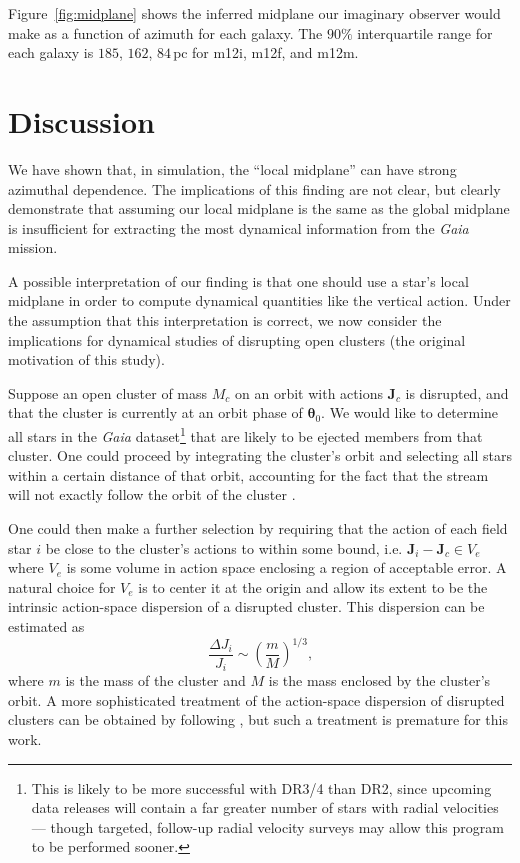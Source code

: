 \documentclass[twocolumn]{aastex62}
\newcommand{\pc}{\text{pc}}
\newcommand{\beq}{\begin{equation}}
\newcommand{\eeq}{\end{equation}}
\begin{document}
Figure~\ref{fig:midplane} shows the inferred midplane our imaginary observer
would make as a function of azimuth for each galaxy. The $90\%$ interquartile
range for each galaxy is $185$, $162$, $84\,\pc$ for m12i, m12f, and m12m. 

\begin{figure*}
\caption{Caption.}
\label{fig:midplane}
\end{figure*}

\section{Discussion} \label{sec:discussion}
We have shown that, in simulation, the ``local midplane'' can have strong
azimuthal dependence. The implications of this finding are not clear, but
clearly demonstrate that assuming our local midplane is the same as the global
midplane is insufficient for extracting the most dynamical information from
the {\em Gaia} mission.

A possible interpretation of our finding is that one should use a star's local
midplane in order to compute dynamical quantities like the vertical action.
Under the assumption that this interpretation is correct, we now consider the
implications for dynamical studies of disrupting open clusters (the original
motivation of this study).

Suppose an open cluster of mass $M_c$ on an orbit with actions $\bm{J}_c$ is
disrupted, and that the cluster is currently at an orbit phase of
$\bm{\theta}_0$. We would like to determine all stars in the {\em Gaia}
dataset\footnote{This is likely to be more successful with DR3/4 than DR2,
since upcoming data releases will contain a far greater number of stars with
radial velocities --- though targeted, follow-up radial velocity surveys may
allow this program to be performed sooner.} that are likely to be ejected
members from that cluster. One could proceed by integrating the cluster's
orbit and selecting all stars within a certain distance of that orbit,
accounting for the fact that the stream will not exactly follow the orbit of
the cluster \citep[e.g.][]{2011MNRAS.413.1852E}.

One could then make a further selection by requiring that the action of each
field star $i$ be close to the cluster's actions to within some bound, i.e.
$\bm{J}_i - \bm{J}_c \in V_e$ where $V_e$ is some volume in action space
enclosing a region of acceptable error. A natural choice for $V_e$ is to
center it at the origin and allow its extent to be the intrinsic action-space
dispersion of a disrupted cluster. This dispersion can be estimated as
\citep[\S~8.3.3][]{2008gady.book.....B}
\beq \label{eq:action_disp}
\frac{\Delta J_i}{J_i} \sim \left(\frac{m}{M}\right)^{1/3}\text{,}
\eeq
where $m$ is the mass of the cluster and $M$ is the mass enclosed by the
cluster's orbit. A more sophisticated treatment of the action-space dispersion
of disrupted clusters can be obtained by following
\citet{2011MNRAS.413.1852E}, but such a treatment is premature for this work.
\end{document}
